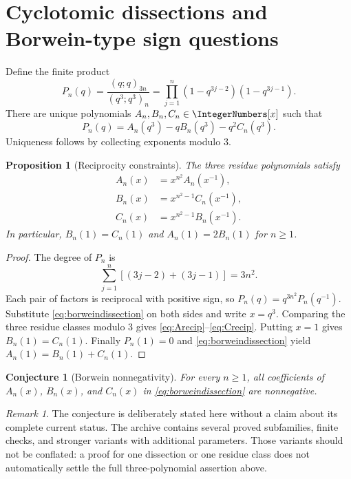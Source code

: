 \documentclass[11pt]{article}
\numberwithin{equation}{section}
\newtheorem{proposition}[theorem]{Proposition}
\newtheorem{conjecture}[theorem]{Conjecture}
\theoremstyle{definition}
\theoremstyle{remark}
\newtheorem{remark}[theorem]{Remark}
\begin{document}
\section{Cyclotomic dissections and Borwein-type sign questions}
\label{sec:borwein}

Define the finite product
\begin{equation}\label{eq:borweinP}
P_n(q)=\frac{(q;q)_{3n}}{(q^3;q^3)_n}
=\prod_{j=1}^n(1-q^{3j-2})(1-q^{3j-1}).
\end{equation}
There are unique polynomials $A_n,B_n,C_n\in\IntegerNumbers[x]$ such that
\begin{equation}\label{eq:borweindissection}
P_n(q)=A_n(q^3)-qB_n(q^3)-q^2C_n(q^3).
\end{equation}
Uniqueness follows by collecting exponents modulo $3$.

\begin{proposition}[Reciprocity constraints]\label{prop:borweinreciprocity}
The three residue polynomials satisfy
\begin{align}
A_n(x)&=x^{n^2}A_n(x^{-1}),\label{eq:Arecip}\\
B_n(x)&=x^{n^2-1}C_n(x^{-1}),\label{eq:Brecip}\\
C_n(x)&=x^{n^2-1}B_n(x^{-1}).\label{eq:Crecip}
\end{align}
In particular, $B_n(1)=C_n(1)$ and $A_n(1)=2B_n(1)$ for $n\ge1$.
\end{proposition}
\begin{proof}
The degree of $P_n$ is
\[
\sum_{j=1}^n[(3j-2)+(3j-1)]=3n^2.
\]
Each pair of factors is reciprocal with positive sign, so
$P_n(q)=q^{3n^2}P_n(q^{-1})$.  Substitute
\eqref{eq:borweindissection} on both sides and write $x=q^3$.  Comparing the
three residue classes modulo $3$ gives \eqref{eq:Arecip}--\eqref{eq:Crecip}.
Putting $x=1$ gives $B_n(1)=C_n(1)$.  Finally $P_n(1)=0$ and
\eqref{eq:borweindissection} yield $A_n(1)=B_n(1)+C_n(1)$.
\end{proof}

\begin{conjecture}[Borwein nonnegativity]\label{conj:borwein}
For every $n\ge1$, all coefficients of $A_n(x)$, $B_n(x)$, and $C_n(x)$ in
\eqref{eq:borweindissection} are nonnegative.
\end{conjecture}

\begin{remark}
The conjecture is deliberately stated here without a claim about its complete
current status.  The archive contains several proved subfamilies, finite
checks, and stronger variants with additional parameters.  Those variants
should not be conflated: a proof for one dissection or one residue class does
not automatically settle the full three-polynomial assertion above.
\end{remark}
\end{document}
